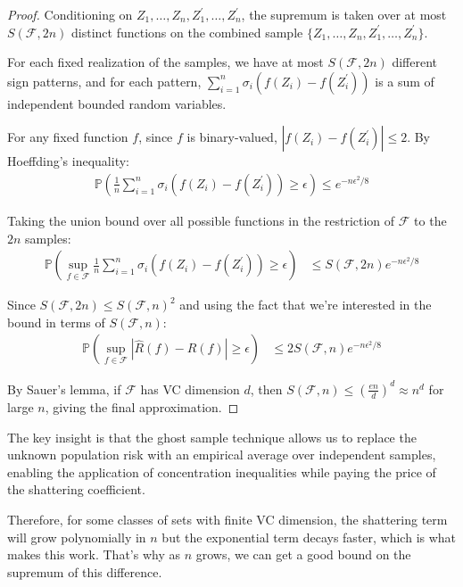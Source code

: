 \begin{proof}
    Conditioning on $Z_1, \ldots, Z_n, Z_1^{\prime}, \ldots, Z_n^{\prime}$, the supremum is taken over at most $S(\mathcal{F}, 2n)$ distinct functions on the combined sample $\{Z_1, \ldots, Z_n, Z_1^{\prime}, \ldots, Z_n^{\prime}\}$.
   
    For each fixed realization of the samples, we have at most $S(\mathcal{F}, 2n)$ different sign patterns, and for each pattern, $\sum_{i=1}^n \sigma_i (f(Z_i) - f(Z_i^{\prime}))$ is a sum of independent bounded random variables.
   
    For any fixed function $f$, since $f$ is binary-valued, $|f(Z_i) - f(Z_i^{\prime})| \leq 2$. By Hoeffding's inequality:
    \begin{align}
      \mathbb{P} \left( \frac{1}{n} \sum_{i=1}^n \sigma_i (f(Z_i) - f(Z_i^{\prime})) \geq \epsilon \right) \leq e^{-n\epsilon^2/8}
    \end{align}
   
    Taking the union bound over all possible functions in the restriction of $\mathcal{F}$ to the $2n$ samples:
    \begin{align}
      \mathbb{P} \left( \sup_{f \in \mathcal{F}} \frac{1}{n} \sum_{i=1}^n \sigma_i (f(Z_i) - f(Z_i^{\prime})) \geq \epsilon \right) &\leq S(\mathcal{F}, 2n) e^{-n\epsilon^2/8}
    \end{align}
   
    Since $S(\mathcal{F}, 2n) \leq S(\mathcal{F}, n)^2$ and using the fact that we're interested in the bound in terms of $S(\mathcal{F}, n)$:
    \begin{align}
      \mathbb{P} \left( \sup_{f \in \mathcal{F}} | \hat{R}(f) - R(f) | \geq \epsilon \right) &\leq 2 S(\mathcal{F}, n) e^{-n\epsilon^2/8}
    \end{align}
   
    By Sauer's lemma, if $\mathcal{F}$ has VC dimension $d$, then $S(\mathcal{F}, n) \leq \left(\frac{en}{d}\right)^d \approx n^d$ for large $n$, giving the final approximation.
  \end{proof}

  The key insight is that the ghost sample technique allows us to replace the unknown population risk with an empirical average over independent samples, enabling the application of concentration inequalities while paying the price of the shattering coefficient.

  Therefore, for some classes of sets with finite VC dimension, the shattering term will grow polynomially in $n$ but the exponential term decays faster, which is what makes this work. That's why as $n$ grows, we can get a good bound on the supremum of this difference. 

